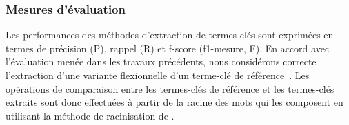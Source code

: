     \subsubsection{Mesures d'évaluation}
    \label{subsubsec:mesures_d_evaluation}
      Les performances des méthodes d'extraction de termes-clés sont exprimées
      en termes de précision (P), rappel (R) et f-score (f1-mesure, F). En
      accord avec l'évaluation menée dans les travaux précédents, nous
      considérons correcte l'extraction d'une variante flexionnelle d'un
      terme-clé de référence~\cite{kim2010semeval}. Les opérations de
      comparaison entre les termes-clés de référence et les termes-clés extraits
      sont donc effectuées à partir de la racine des mots qui les composent en
      utilisant la méthode de racinisation de
      .

